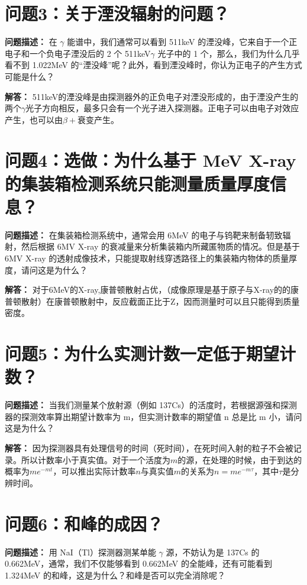 \documentclass{article}
\begin{document}
\section{问题3：关于湮没辐射的问题？}
\label{sec:prob3}

\textbf{问题描述：} 在 $\gamma$ 能谱中，我们通常可以看到 511keV 的湮没峰，它来自于一个正电子和一个负电子湮没后的 2 个 511keV$\gamma$ 光子中的 1 个，那么，我们为什么几乎看不到 1.022MeV 的“湮没峰”呢？此外，看到湮没峰时，你认为正电子的产生方式可能是什么？

\textbf{解答：} 511keV的湮没峰是由探测器外的正负电子对湮没形成的，由于湮没产生的两个$\gamma$光子方向相反，最多只会有一个光子进入探测器。正电子可以由电子对效应产生，也可以由$\beta+$衰变产生。

\section*{问题4：选做：为什么基于 MeV X-ray 的集装箱检测系统只能测量质量厚度信息？}
\label{sec:prob4}

\textbf{问题描述：} 在集装箱检测系统中，通常会用 6MeV 的电子与钨靶来制备轫致辐射，然后根据 6MV X-ray 的衰减量来分析集装箱内所藏匿物质的情况。但是基于 6MV X-ray 的透射成像技术，只能提取射线穿透路径上的集装箱内物体的质量厚度，请问这是为什么？

\textbf{解答：} 对于6MeV的X-ray,康普顿散射占优，（成像原理是基于原子与X-ray的的康普顿散射）在康普顿散射中，反应截面正比于Z，因而测量时可以且只能得到质量密度。

\section{问题5：为什么实测计数一定低于期望计数？}
\label{sec:prob5}

\textbf{问题描述：} 当我们测量某个放射源（例如 137Cs）的活度时，若根据源强和探测器的探测效率算出期望计数率为 m，但实测计数率的期望值 n 总是比 m 小，请问这是为什么？

\textbf{解答：} 因为探测器具有处理信号的时间（死时间），在死时间入射的粒子不会被记录。所以计数率小于真实值。对于一个活度为$m$的源，在处理的时候，由于到达的概率为$m e^{-mt}$，可以推出实际计数率$n$与真实值$m$的关系为$n=me^{-m\tau}$，其中$\tau$是分辨时间。

\section{问题6：和峰的成因？}
\label{sec:prob6}

\textbf{问题描述：} 用 NaI（Tl）探测器测某单能 $\gamma$ 源，不妨认为是 137Cs 的 0.662MeV，通常，我们不仅能够看到 0.662MeV 的全能峰，还有可能看到 1.324MeV 的和峰，这是为什么？和峰是否可以完全消除呢？
\end{document}
